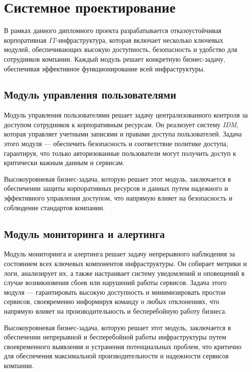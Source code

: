 \section{Системное проектирование}

В рамках данного дипломного проекта разрабатывается отказоустойчивая корпоративная \textit{IT}-инфраструктура, которая включает несколько ключевых модулей, обеспечивающих высокую доступность, безопасность и удобство для сотрудников компании. Каждый модуль решает конкретную бизнес-задачу, обеспечивая эффективное функционирование всей инфраструктуры.

\subsection{Модуль управления пользователями} 
\label{sec:user_management_module}

Модуль управления пользователями решает задачу централизованного контроля за доступом сотрудников к корпоративным ресурсам. Он реализует систему \textit{IDM}, которая управляет учетными записями и правами доступа пользователей. Задача этого модуля — обеспечить безопасность и соответствие политике доступа, гарантируя, что только авторизованные пользователи могут получить доступ к критически важным данным и сервисам.

Высокоуровневая бизнес-задача, которую решает этот модуль, заключается в обеспечении защиты корпоративных ресурсов и данных путем надежного и эффективного управления доступом, что напрямую влияет на безопасность и соблюдение стандартов компании.

\subsection{Модуль мониторинга и алертинга} 
\label{sec:monitoring_alerting_module}

Модуль мониторинга и алертинга решает задачу непрерывного наблюдения за состоянием всех ключевых компонентов инфраструктуры. Он собирает метрики и логи, анализирует их, а также настраивает систему уведомлений и оповещений в случае возникновения сбоев или нарушений работы сервисов. Задача этого модуля — гарантировать высокую доступность и минимизировать простои сервисов, своевременно информируя команду о любых отклонениях, что напрямую влияет на производительность и бесперебойную работу бизнеса.

Высокоуровневая бизнес-задача, которую решает этот модуль, заключается в обеспечении непрерывной и бесперебойной работы инфраструктуры путем своевременного выявления и устранения потенциальных проблем, что критично для обеспечения максимальной производительности и надежности сервисов компании.

